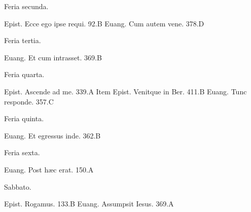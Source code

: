 \documentclass[a5paper,10pt]{book}
\def\ae{æ}
\begin{document}
\begin{multicols}{2}
\begin{center}
\color{red} Feria secunda.
\end{center}
\vspace{-.75em}
\par \noindent Epist. Ecce ego ipse requi. \hfill 92.B
\newline Euang. Cum autem vene. \hfill 378.D
\newline \vspace{-1.75em}
\begin{center}
\color{red} Feria tertia.
\end{center}
\vspace{-.75em}
\par \noindent Euang. Et cum intrasset. \hfill 369.B
\newline \vspace{-1.75em}
\begin{center}
\color{red} Feria quarta.
\end{center}
\vspace{-.75em}
\par \noindent Epist. Ascende ad me. \hfill 339.A
\newline Item Epist. Venitque in Ber. \hfill 411.B
\newline Euang. Tunc responde. \hfill 357.C
\newline \vspace{-1.75em}
\begin{center}
\color{red} Feria quinta.
\end{center}
\vspace{-.75em}
\par \noindent Euang. Et egressus inde. \hfill 362.B
\newline \vspace{-1.75em}
\begin{center}
\color{red} Feria sexta.
\end{center}
\vspace{-.75em}
\par \noindent Euang. Post h\ae c erat. \hfill 150.A
\newline \vspace{-1.75em}
\begin{center}
\color{red} Sabbato.
\end{center}
\vspace{-.75em}
\par \noindent Epist. Rogamus. \hfill 133.B
\newline Euang. Assumpsit Iesus. \hfill 369.A
\newline \vspace{-1.75em}

\end{multicols}
\end{document}
